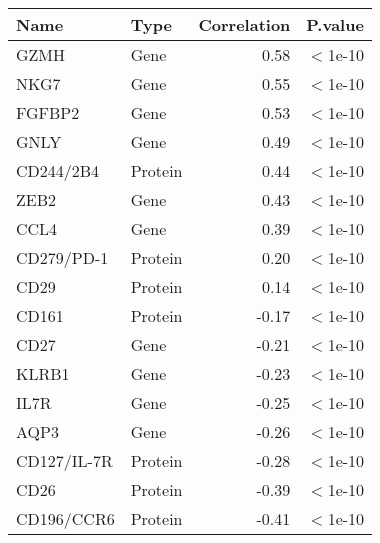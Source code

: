 \begin{tabular}{llrl}
  \hline
Name & Type & Correlation & P.value \\ 
  \hline
GZMH & Gene & 0.58 & $<$1e-10 \\ 
  NKG7 & Gene & 0.55 & $<$1e-10 \\ 
  FGFBP2 & Gene & 0.53 & $<$1e-10 \\ 
  GNLY & Gene & 0.49 & $<$1e-10 \\ 
  CD244/2B4 & Protein & 0.44 & $<$1e-10 \\ 
  ZEB2 & Gene & 0.43 & $<$1e-10 \\ 
  CCL4 & Gene & 0.39 & $<$1e-10 \\ 
  CD279/PD-1 & Protein & 0.20 & $<$1e-10 \\ 
  CD29 & Protein & 0.14 & $<$1e-10 \\ 
  CD161 & Protein & -0.17 & $<$1e-10 \\ 
  CD27 & Gene & -0.21 & $<$1e-10 \\ 
  KLRB1 & Gene & -0.23 & $<$1e-10 \\ 
  IL7R & Gene & -0.25 & $<$1e-10 \\ 
  AQP3 & Gene & -0.26 & $<$1e-10 \\ 
  CD127/IL-7R & Protein & -0.28 & $<$1e-10 \\ 
  CD26 & Protein & -0.39 & $<$1e-10 \\ 
  CD196/CCR6 & Protein & -0.41 & $<$1e-10 \\ 
   \hline
\end{tabular}
